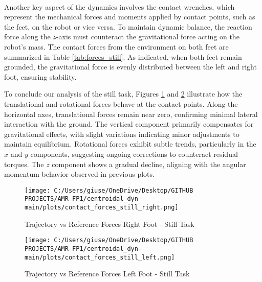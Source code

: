 \documentclass[main.tex]{subfiles}
\begin{document}
\\
Another key aspect of the dynamics involves the contact wrenches, which represent the mechanical forces and moments applied by contact points, such as the feet, on the robot or vice versa. To maintain dynamic balance, the reaction force along the $z$-axis must counteract the gravitational force acting on the robot’s mass. The contact forces from the environment on both feet are summarized in Table \ref{tab:forces_still}. As indicated, when both feet remain grounded, the gravitational force is evenly distributed between the left and right foot, ensuring stability.
\begin{table}[H]
    \centering
    \renewcommand{\arraystretch}{1.2}
    \caption{Summary of Forces and Foot Positions per Interval - Still Task}
    \label{tab:forces_still}
\end{table}
To conclude our analysis of the still task, Figures \ref{fig:contact_forces_still_right} and \ref{fig:contact_forces_still_left} illustrate how the translational and rotational forces behave at the contact points. Along the horizontal axes, translational forces remain near zero, confirming minimal lateral interaction with the ground. The vertical component primarily compensates for gravitational effects, with slight variations indicating minor adjustments to maintain equilibrium. Rotational forces exhibit subtle trends, particularly in the \( x \) and \( y \) components, suggesting ongoing corrections to counteract residual torques. The \( z \) component shows a gradual decline, aligning with the angular momentum behavior observed in previous plots.
\begin{figure}[htbp]
    \centering
    \texttt{[image: C:/Users/giuse/OneDrive/Desktop/GITHUB PROJECTS/AMR-FP1/centroidal\_dyn-main/plots/contact\_forces\_still\_right.png]}
    \caption{Trajectory vs Reference Forces Right Foot - Still Task}
    \label{fig:contact_forces_still_right}
\end{figure}
\begin{figure}[htbp]
    \centering
    \texttt{[image: C:/Users/giuse/OneDrive/Desktop/GITHUB PROJECTS/AMR-FP1/centroidal\_dyn-main/plots/contact\_forces\_still\_left.png]}
    \caption{Trajectory vs Reference Forces Left Foot - Still Task}
    \label{fig:contact_forces_still_left}
\end{figure}
\newpage
\end{document}
